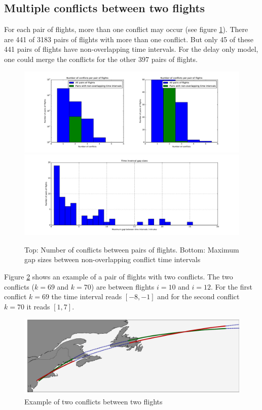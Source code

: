 \documentclass{article}
\begin{document}
\subsection{Multiple conflicts between two flights}
For each pair of flights, more than one conflict may occur (see figure \ref{fig:pre_overlapping_time_intervals}).
There are 441 of 3183 pairs of flights with more than one conflict.
But only 45 of these 441 pairs of flights have non-overlapping time intervals.
For the delay only model, one could merge the conflicts for the other 397 pairs of flights.
\begin{figure}[htpb]
    \centering
    \includegraphics[width=1.0\linewidth]{pics/potential_conflicts_non_overlapping_time_intervals_statistics.pdf}
    \includegraphics[width=1.0\linewidth]{pics/potential_conflicts_non_overlapping_time_intervals_gap_sizes.pdf}
    \caption{Top: Number of conflicts between pairs of flights. Bottom: Maximum gap sizes between non-overlapping conflict time intervals}
    \label{fig:pre_overlapping_time_intervals}
\end{figure}

Figure \ref{fig:pre_flight_pair_with_two_conflicts} shows an example of a pair of flights with two conflicts.
The two conflicts ($k=69$ and $k=70$) are between flights $i=10$ and $i=12$.
For the first conflict $k=69$ the time interval reads $[-8, -1]$ and for the second conflict $k=70$ it reads $[1, 7]$.
\begin{figure}[htpb]
    \centering
    \includegraphics[width=1.0\linewidth]{pics/pre_flight_pair_with_two_conflicts.pdf}
    \caption{Example of two conflicts between two flights}
    \label{fig:pre_flight_pair_with_two_conflicts}
\end{figure}
\end{document}
